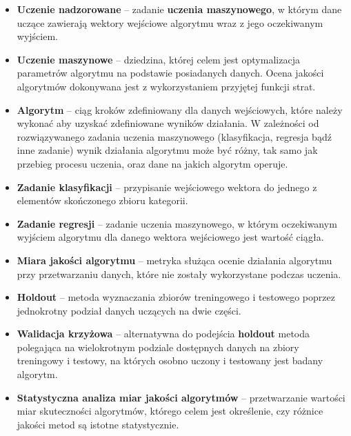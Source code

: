 \documentclass[12pt]{article}
\begin{document}
\begin{itemize}
	\item 
	\textbf{Uczenie nadzorowane} -- zadanie \textbf{uczenia maszynowego}, w którym dane uczące zawierają wektory wejściowe algorytmu wraz z jego oczekiwanym wyjściem\cite{Bishop2006}. 
	
	\item 
	\textbf{Uczenie maszynowe} -- dziedzina, której celem jest optymalizacja parametrów algorytmu na podstawie posiadanych danych. Ocena jakości algorytmów dokonywana jest z wykorzystaniem przyjętej funkcji strat\cite{Alpaydin2014}.
	
	\item
	\textbf{Algorytm} -- ciąg kroków zdefiniowany dla danych wejściowych, które należy wykonać aby uzyskać zdefiniowane wyników działania. W zależności od rozwiązywanego zadania uczenia maszynowego (klasyfikacja, regresja bądź inne zadanie) wynik działania algorytmu może być różny, tak samo jak przebieg procesu uczenia, oraz dane na jakich algorytm operuje.
	
	\item 
	\textbf{Zadanie klasyfikacji} -- przypisanie wejściowego wektora do jednego z elementów skończonego zbioru kategorii\cite{Bishop2006}. 
	
	\item 
	\textbf{Zadanie regresji} -- zadanie uczenia maszynowego, w którym oczekiwanym wyjściem algorytmu dla danego wektora wejściowego jest wartość ciągła\cite{Bishop2006}.
	
	\item 
	\textbf{Miara jakości algorytmu} -- metryka służąca ocenie działania algorytmu przy przetwarzaniu danych, które nie zostały wykorzystane podczas uczenia.
	
	\item 
	\textbf{Holdout} -- metoda wyznaczania zbiorów treningowego i testowego poprzez jednokrotny podział danych uczących na dwie części.
	
	\item 
	\textbf{Walidacja krzyżowa} -- alternatywna do podejścia \textbf{holdout} metoda polegająca na wielokrotnym podziale dostępnych danych na zbiory treningowy i testowy, na których osobno uczony i testowany jest badany algorytm\cite{Alpaydin2014}.

	\item 
	\textbf{Statystyczna analiza miar jakości algorytmów} -- przetwarzanie wartości miar skuteczności algorytmów, którego celem jest określenie, czy różnice jakości metod są istotne statystycznie\cite{Dietterich1998}.
	
\end{itemize}
\end{document}
